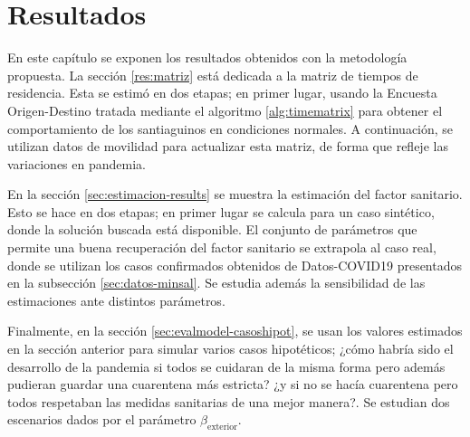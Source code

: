 \chapter{Resultados} \label{chap:results}


En este capítulo se exponen los resultados obtenidos con la metodología propuesta. La sección \ref{res:matriz} está dedicada a la matriz de tiempos de residencia. Esta se estimó en dos etapas; en primer lugar, usando la Encuesta Origen-Destino tratada mediante el algoritmo \ref{alg:timematrix} para obtener el comportamiento de los santiaguinos en condiciones normales. A continuación, se utilizan datos de movilidad para actualizar esta matriz, de forma que refleje las variaciones en pandemia.

En la sección \ref{sec:estimacion-results} se muestra la estimación del factor sanitario. Esto se hace en dos etapas; en primer lugar se calcula para un caso sintético, donde la solución buscada está disponible. El conjunto de parámetros que permite una buena recuperación del factor sanitario se extrapola al caso real, donde se utilizan los casos confirmados obtenidos de Datos-COVID19 presentados en la subsección \ref{sec:datos-minsal}. Se estudia además la sensibilidad de las estimaciones ante distintos parámetros.

Finalmente, en la sección \ref{sec:evalmodel-casoshipot}, se usan los valores estimados en la sección anterior para simular varios casos hipotéticos; ¿cómo habría sido el desarrollo de la pandemia si todos se cuidaran de la misma forma pero además pudieran guardar una cuarentena más estricta? ¿y si no se hacía cuarentena pero todos respetaban las medidas sanitarias de una mejor manera?.  Se estudian dos escenarios dados por el parámetro \(\beta_{\text{exterior}}\).











